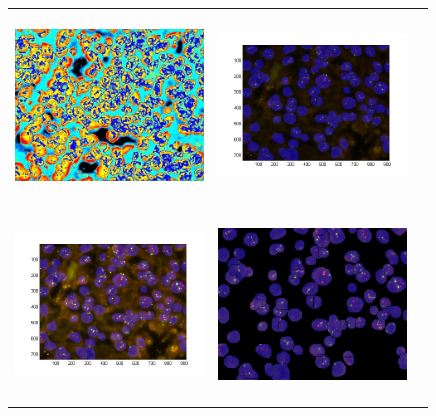 \begin{tabular}{ |c|c|c| }
\includegraphics[width=5.0cm,height=5.0cm]{images/Her2Fish/4_RGB_LabelImg.jpg}  &
\includegraphics[width=5.0cm,height=5.0cm]{images/Her2Fish/B31-1677A108_ProcessedlabelimageWithSpotsEnhanced.jpg}  \\
\includegraphics[width=5.0cm,height=5.0cm]{images/Her2Fish/B31-1677A108_ProcessedlabelimageWithSpotsEnhanced2.jpg}  &
\includegraphics[width=5.0cm,height=5.0cm]{images/Her2Fish/B31-1677A108_ProcessedlabelimageWithSpotsEnhanced3.jpg}
\end{tabular}

